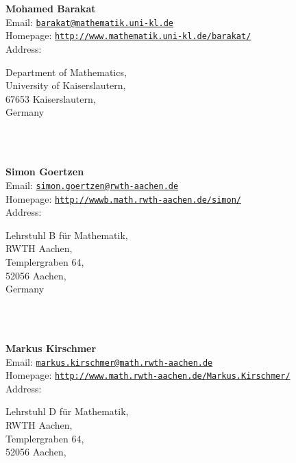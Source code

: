 \documentclass[a4paper,11pt]{report}
\begin{document}
\begin{titlepage}
\mbox{}\\
{\mbox{}\\
\small \noindent \textbf{Mohamed Barakat\\
    }  Email: \href{mailto://barakat@mathematik.uni-kl.de} {\texttt{barakat@mathematik.uni-kl.de}}\\
  Homepage: \href{http://www.mathematik.uni-kl.de/~barakat/} {\texttt{http://www.mathematik.uni-kl.de/\texttt{}barakat/}}\\
  Address: \begin{minipage}[t]{8cm}\noindent
 Department of Mathematics, \\
 University of Kaiserslautern, \\
 67653 Kaiserslautern, \\
 Germany \end{minipage}
}\\
{\mbox{}\\
\small \noindent \textbf{Simon Goertzen\\
    }  Email: \href{mailto://simon.goertzen@rwth-aachen.de} {\texttt{simon.goertzen@rwth-aachen.de}}\\
  Homepage: \href{http://wwwb.math.rwth-aachen.de/~simon/} {\texttt{http://wwwb.math.rwth-aachen.de/\texttt{}simon/}}\\
  Address: \begin{minipage}[t]{8cm}\noindent
 Lehrstuhl B f{\"u}r Mathematik, \\
 RWTH Aachen, \\
 Templergraben 64, \\
 52056 Aachen, \\
 Germany \end{minipage}
}\\
{\mbox{}\\
\small \noindent \textbf{Markus Kirschmer\\
    }  Email: \href{mailto://markus.kirschmer@math.rwth-aachen.de} {\texttt{markus.kirschmer@math.rwth-aachen.de}}\\
  Homepage: \href{http://www.math.rwth-aachen.de/~Markus.Kirschmer/} {\texttt{http://www.math.rwth-aachen.de/\texttt{}Markus.Kirschmer/}}\\
  Address: \begin{minipage}[t]{8cm}\noindent
 Lehrstuhl D f{\"u}r Mathematik, \\
 RWTH Aachen, \\
 Templergraben 64, \\
 52056 Aachen, \\

\end{minipage}}
\end{titlepage}
\end{document}
